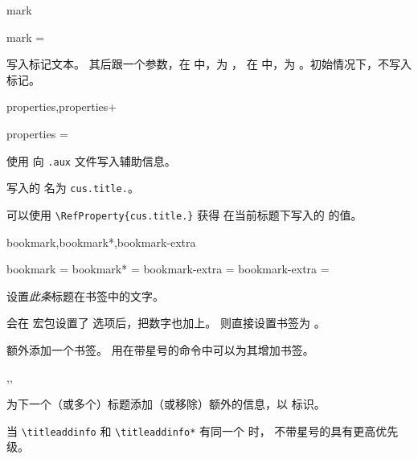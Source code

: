 \documentclass{cusdoc}
\begin{document}
\begin{keyval}[path=title/...]{mark}
  \begin{syntax}
    mark = 
  \end{syntax}
写入标记文本。 其后跟一个参数，在  中，为 ，
在  中，为 。初始情况下，不写入标记。
\end{keyval}

\begin{keyval}[path=title/...]{properties,properties+}
  \begin{syntax}
    properties = 
  \end{syntax}
使用  向 \texttt{.aux} 文件写入辅助信息。

写入的  名为 \texttt{cus.title.}。

可以使用 \verb|\RefProperty{cus.title.|\verb|}| 获得
在当前标题下写入的  的值。
\end{keyval}

\begin{keyval}[path=title/...]{bookmark,bookmark*,bookmark-extra}
  \begin{syntax}
    bookmark  = 
    bookmark* = 
    bookmark-extra = 
    bookmark-extra =  
  \end{syntax}
设置\emph{此条}标题在书签中的文字。

 会在  宏包设置了  选项后，把数字也加上。
\linebreak{} 则直接设置书签为 。

 额外添加一个书签。
用在带星号的命令中可以为其增加书签。
\end{keyval}

\begin{function}{\titleaddinfo,\titleremoveinfo,\titleremoveallinfo}
  \begin{syntax}
    \V\titleaddinfo   {} 
    \V\titleaddinfo *  
    \V\titleremoveinfo  {} 
    \V\titleremoveinfo *  
    \V\titleremoveallinfo 
    \V\titleremoveallinfo *
  \end{syntax}
为下一个（或多个）标题添加（或移除）额外的信息，以  标识。

当 \verb|\titleaddinfo| 和 \verb|\titleaddinfo*| 有同一个  时，
不带星号的具有更高优先级。
\end{function}
\end{document}
